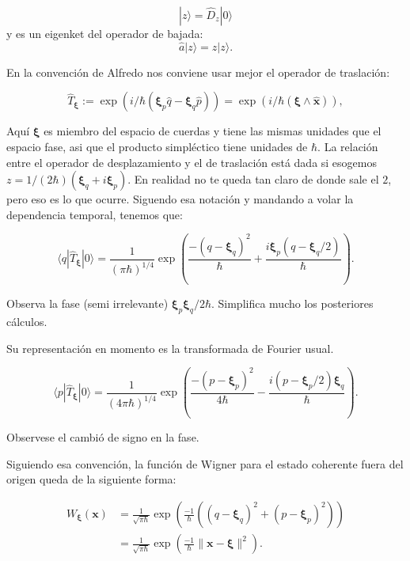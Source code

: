 \documentclass[a4paper,10pt]{article}
\newcommand{\xfase}{\mathbf{x}}
\newcommand{\xifase}{ {\boldsymbol{\xi}} }
\newcommand{\bra}[1]{\langle #1|}
\newcommand{\ket}[1]{|#1\rangle}
\begin{document}
\begin{equation}
\ket{z}=\hat{D}_z \ket{0}
\end{equation}
y es un eigenket del operador de bajada:
\begin{equation}
\hat{a}\ket{z}=z \ket{z}.
\end{equation}

En la convención de Alfredo nos conviene usar mejor el 
operador de traslación:

\begin{equation}
\hat{T}_\xifase := \exp(i/\hbar (\xifase_p\hat{q}-\xifase_q\hat{p}))
=\exp(i/\hbar (\xifase\wedge\hat{\xfase})),
\end{equation}

Aquí $\xifase$ es miembro del espacio de cuerdas y tiene las 
mismas unidades que el espacio fase, asi que el producto
simpléctico tiene unidades de $\hbar$. La relación entre
el operador de desplazamiento y el de traslación está dada si esogemos
$z=1/(2\hbar)(\xifase_q + i \xifase_p)$. En realidad no te queda tan claro
de donde sale el $2$, pero eso es lo que ocurre.
Siguendo esa notación y mandando a volar la dependencia temporal, 
tenemos que: 

\begin{equation}
\bra{q}\hat{T}_\xifase\ket{0}=\frac{1}{(\pi\hbar)^{1/4}}
\exp\left(\frac{-(q-\xifase_q)^2}{\hbar}+
\frac{i\xifase_p (q-\xifase_q/2)}{\hbar}\right).
\end{equation}

Observa la fase (semi irrelevante) $\xifase_p \xifase_q/2\hbar$.
Simplifica mucho los posteriores cálculos.

Su representación en momento es la transformada de Fourier usual.

\begin{equation}
\bra{p}\hat{T}_\xifase\ket{0}=\frac{1}{(4\pi\hbar)^{1/4}}
\exp\left(\frac{-(p-\xifase_p)^2}{4\hbar}-
\frac{i(p-\xifase_p/2)\xifase_q}{\hbar}\right).
\end{equation}

Observese el cambió de signo en la fase. 

Siguiendo esa convención, la función de Wigner para el estado
coherente fuera del origen queda de la siguiente forma:

\begin{equation}
\begin{split}
W_\xifase(\xfase)&=\frac{1}{\sqrt{\pi\hbar}}
  \exp\left(\frac{-1}{\hbar}
\left((q-\xifase_q)^2+(p-\xifase_p)^2\right)\right)\\
&=\frac{1}{\sqrt{\pi\hbar}}
\exp\left(\frac{-1}{\hbar}
\|\xfase-\xifase\|^2\right).
\end{split}
\end{equation}
\end{document}
